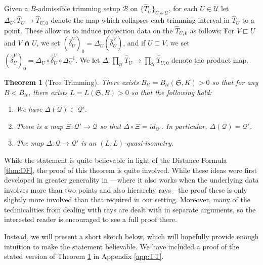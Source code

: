 \documentclass{amsart}
\newtheorem{theorem}{Theorem}[section]
\theoremstyle{definition}
\theoremstyle{remark}
\theoremstyle{definition}
\newcommand{\calB}{\mathcal{B}}
\newcommand{\calQ}{\mathcal{Q}}
\newcommand{\calU}{\mathcal{U}}
\newcommand{\hT}{\widehat{T}}
\newcommand{\hd}{\hat{\delta}}
\newcommand{\nest}{\sqsubset}
\begin{document}
Given a $B$-admissible trimming setup $\calB$ on $\{\hT_U\}_{U \in\calU}$, for each $U \in \calU$ let $\Delta_U:\hT_U \to \hT_{U,0}$ denote the map which collapses each trimming interval in $\hT_U$ to a point.  These allow us to induce projection data on the $\hT_{U,0}$ as follows: For $V \nest U$ and $V \pitchfork U$, we set $(\hd^V_U)_0 = \Delta_U(\hd^V_U)$, and if $U \nest V$, we set $(\hd^V_U)_0 = \Delta_U \circ \hd^V_U \circ \Delta^{-1}_V$.  We let $\Delta: \prod_{\calU} \hT_U \to \prod_{\calU} \hT_{U,0}$ denote the product map.


\begin{theorem}[Tree Trimming]\label{thm:tree trimming}
There exists $B_{tt} = B_{tt}(\mathfrak S, K)>0$ so that for any $B < B_{tt}$, there exists $L =L(\mathfrak S, B)>0$ so that the following hold:

\begin{enumerate}
\item We have $\Delta(\calQ) \subset \calQ'$.
\item There is a map $\Xi:\calQ' \to \calQ$ so that $\Delta \circ \Xi = id_{\calQ'}$.  In particular, $\Delta(\calQ) = \calQ'$.
\item The map $\Delta:\calQ \to \calQ'$ is an $(L,L)$-quasi-isometry.
\end{enumerate}
\end{theorem}

While the statement is quite believable in light of the Distance Formula \ref{thm:DF}, the proof of this theorem is quite involved.  While these ideas were first developed in greater generality in \cite[Section 10]{Dur_infcube}---where it also works when the underlying data involves more than two points and also hierarchy rays---the proof these is only slightly more involved than that required in our setting.  Moreover, many of the technicalities from dealing with rays are dealt with in separate arguments, so the interested reader is encouraged to see a full proof there.

Instead, we will present a short sketch below, which will hopefully provide enough intuition to make the statement believable.  We have included a proof of the stated version of Theorem \ref{thm:tree trimming} in Appendix \ref{app:TT}.
\end{document}
